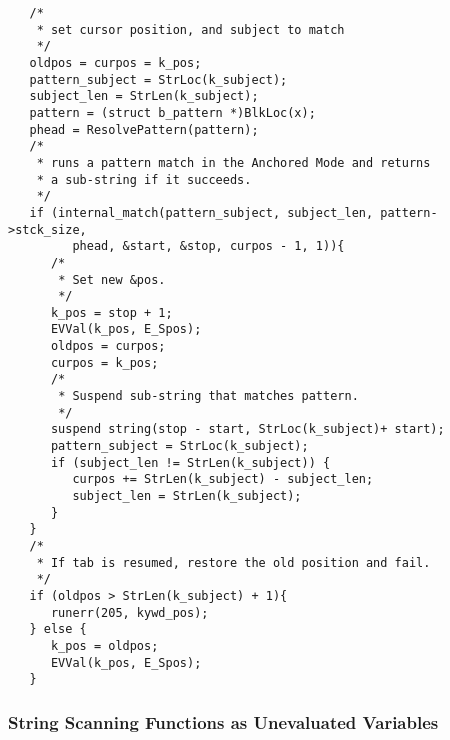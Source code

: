 \documentclass{article}
\begin{document}
\begin{verbatim}
   /*
    * set cursor position, and subject to match
    */
   oldpos = curpos = k_pos;
   pattern_subject = StrLoc(k_subject);
   subject_len = StrLen(k_subject);
   pattern = (struct b_pattern *)BlkLoc(x);
   phead = ResolvePattern(pattern);
   /*
    * runs a pattern match in the Anchored Mode and returns
    * a sub-string if it succeeds.
    */	
   if (internal_match(pattern_subject, subject_len, pattern->stck_size,
         phead, &start, &stop, curpos - 1, 1)){
      /*
       * Set new &pos.
       */ 
      k_pos = stop + 1;
      EVVal(k_pos, E_Spos);	
      oldpos = curpos;
      curpos = k_pos;
      /*
       * Suspend sub-string that matches pattern.
       */
      suspend string(stop - start, StrLoc(k_subject)+ start);
      pattern_subject = StrLoc(k_subject);
      if (subject_len != StrLen(k_subject)) {
         curpos += StrLen(k_subject) - subject_len;
         subject_len = StrLen(k_subject);
      }
   }
   /*
    * If tab is resumed, restore the old position and fail.
    */
   if (oldpos > StrLen(k_subject) + 1){
      runerr(205, kywd_pos);
   } else {
      k_pos = oldpos;
      EVVal(k_pos, E_Spos);
   }
\end{verbatim}

\subsubsection{String Scanning Functions as Unevaluated Variables}
\end{document}
